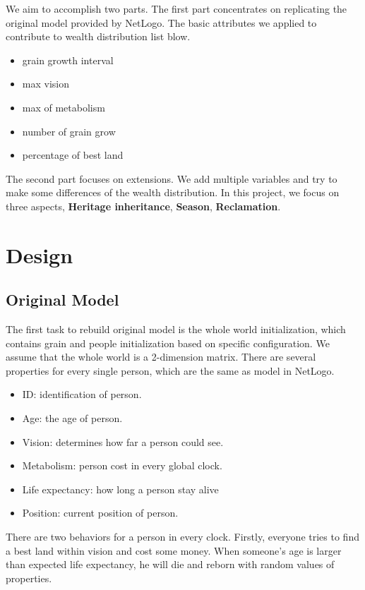 We aim to accomplish two parts. The first part concentrates on replicating the original model provided by NetLogo. The basic attributes we applied to contribute to wealth distribution list blow.
\begin{multicols}{2}
  \begin{itemize}
	\item grain growth interval
	\item max vision
	\item max of metabolism
	\item number of grain grow
	\item percentage of best land
\end{itemize}
\end{multicols}

The second part focuses on extensions. We add multiple variables and try to make some differences of the wealth distribution. In this project, we focus on three aspects, \textbf{Heritage inheritance}, \textbf{Season}, \textbf{Reclamation}.
\section{Design}
\subsection{Original Model}
The first task to rebuild original model is the whole world initialization, which contains grain and people initialization based on specific configuration. We assume that the whole world is a 2-dimension matrix. There are several properties for every single person, which are the same as model in NetLogo.
   \begin{multicols}{2}
   	  \begin{itemize}
   	\item ID: identification of person.
   	\item Age: the age of person.
	\item Vision: determines how far a person could see.
	\item Metabolism: person cost in every global clock.
	\item Life expectancy: how long a person stay alive
	\item Position: current position of person.
\end{itemize}
\end{multicols}
There are two behaviors for a person in every clock. Firstly, everyone tries to find a best land within vision and cost some money. When someone's age is larger than expected life expectancy, he will die and reborn with random values of properties.

